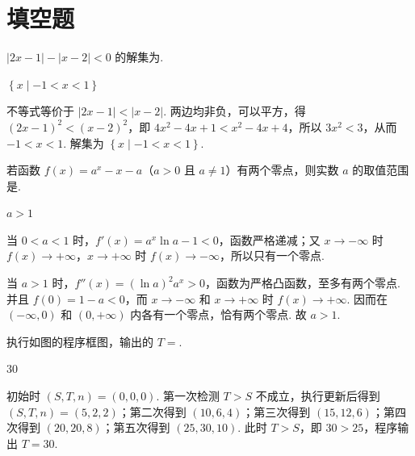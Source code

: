 \section{填空题}

\begin{problem}
\(\lvert 2x - 1\rvert - \lvert x - 2\rvert < 0\) 的解集为\fillinblank{}.
\end{problem}

\begin{answer}
\(\left\{x\mid -1 < x < 1\right\}\)
\end{answer}

\begin{solution}
不等式等价于 \(\lvert2x-1\rvert<\lvert x-2\rvert\). 两边均非负，可以平方，得 \((2x-1)^2<(x-2)^2\)，即 \(4x^2-4x+1<x^2-4x+4\)，所以 \(3x^2<3\)，从而 \(-1<x<1\). 解集为 \(\left\{x\mid-1<x<1\right\}\).
\end{solution}

\begin{problem}
若函数 \( f(x) = a^x - x - a\)（\(a > 0\) 且 \(a \neq 1\)）有两个零点，则实数 \(a\) 的取值范围是\fillinblank{}.
\end{problem}

\begin{answer}
\(a > 1\)
\end{answer}

\begin{solution}
当 \(0<a<1\) 时，\(f'(x)=a^x\ln a-1<0\)，函数严格递减；又 \(x\to-\infty\) 时 \(f(x)\to+\infty\)，\(x\to+\infty\) 时 \(f(x)\to-\infty\)，所以只有一个零点.

当 \(a>1\) 时，\(f''(x)=(\ln a)^2a^x>0\)，函数为严格凸函数，至多有两个零点. 并且 \(f(0)=1-a<0\)，而 \(x\to-\infty\) 和 \(x\to+\infty\) 时 \(f(x)\to+\infty\). 因而在 \((-\infty,0)\) 和 \((0,+\infty)\) 内各有一个零点，恰有两个零点. 故 \(a>1\).
\end{solution}

\begin{problem}
执行如图的程序框图，输出的 \(T=\)\fillinblank{}.

\end{problem}

\begin{answer}
\(30\)
\end{answer}

\begin{solution}
初始时 \((S,T,n)=(0,0,0)\). 第一次检测 \(T>S\) 不成立，执行更新后得到 \((S,T,n)=(5,2,2)\)；第二次得到 \((10,6,4)\)；第三次得到 \((15,12,6)\)；第四次得到 \((20,20,8)\)；第五次得到 \((25,30,10)\). 此时 \(T>S\)，即 \(30>25\)，程序输出 \(T=30\).
\end{solution}

